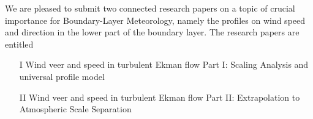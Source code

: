 \documentclass[brief]{fub}
\begin{document}


We are pleased to submit two connected research papers on a topic of crucial importance for Boundary-Layer Meteorology,
namely the profiles on wind speed and direction in the lower part of the boundary layer.
%
The research papers are entitled
\begin{itemize}
\item[I] Wind veer and speed in turbulent Ekman flow Part I: Scaling Analysis and universal profile model
\item[II] Wind veer and speed in turbulent Ekman flow Part II: Extrapolation to Atmospheric Scale Separation
\end{itemize} 
\end{document}
